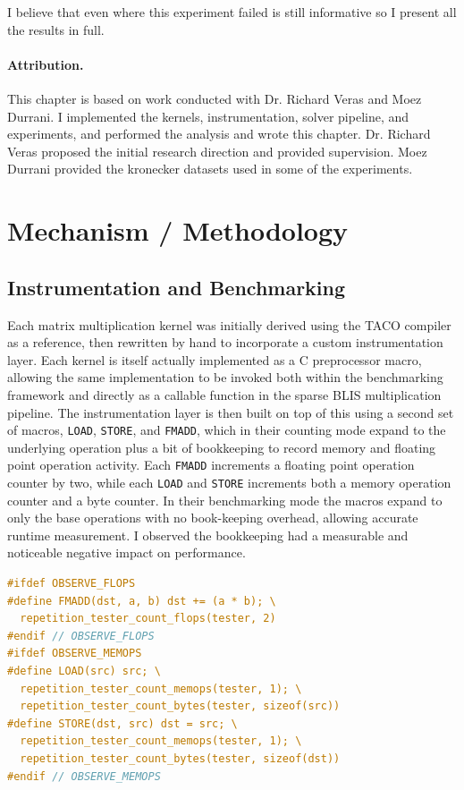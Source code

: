I believe that even where this experiment failed is still informative so I present all the results in full.

\paragraph{Attribution.}
This chapter is based on work conducted with Dr. Richard Veras and Moez Durrani. I
implemented the kernels, instrumentation, solver pipeline, and experiments,
and performed the analysis and wrote this chapter. Dr. Richard Veras proposed the
initial research direction and provided supervision. Moez Durrani provided the kronecker datasets used in some of the experiments.

\section{Mechanism / Methodology}

\subsection{Instrumentation and Benchmarking}
Each matrix multiplication kernel was initially derived using the TACO compiler as a reference,
then rewritten by hand to incorporate a custom instrumentation layer. Each kernel is
itself actually implemented as a C preprocessor macro, allowing the same implementation
to be invoked both within the benchmarking framework and directly as a callable
function in the sparse BLIS multiplication pipeline. The instrumentation layer is then
built on top of this using a second set of macros, \texttt{LOAD}, \texttt{STORE},
and \texttt{FMADD}, which in their counting mode expand to the underlying operation
plus a bit of bookkeeping to record memory and floating point operation activity.
Each \texttt{FMADD} increments a floating point operation counter by two, while
each \texttt{LOAD} and \texttt{STORE} increments both a memory operation counter and a
byte counter. In their benchmarking mode the macros expand to only the base operations with
no book-keeping overhead, allowing accurate runtime measurement. I observed the bookkeeping
had a measurable and noticeable negative impact on performance.

\begin{lstlisting}[float, language=C, caption={Instrumentation macros}]
#ifdef OBSERVE_FLOPS
#define FMADD(dst, a, b) dst += (a * b); \
  repetition_tester_count_flops(tester, 2)
#endif // OBSERVE_FLOPS
#ifdef OBSERVE_MEMOPS
#define LOAD(src) src; \
  repetition_tester_count_memops(tester, 1); \
  repetition_tester_count_bytes(tester, sizeof(src))
#define STORE(dst, src) dst = src; \
  repetition_tester_count_memops(tester, 1); \
  repetition_tester_count_bytes(tester, sizeof(dst))
#endif // OBSERVE_MEMOPS
\end{lstlisting}

